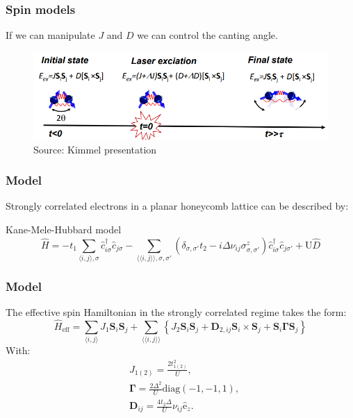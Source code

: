 \documentclass{beamer}
\newcommand{\bs}[1] {\boldsymbol{#1}}
\begin{document}
\begin{frame}
\frametitle{Spin models}
If we can manipulate $J$ and $D$ we can control the canting angle.
\begin{figure}
\includegraphics[width=1\linewidth]{../Figures/canted_afm.png}
\caption{Source: Kimmel presentation}
\end{figure}
\end{frame}




\begin{frame}
\frametitle{Model}
Strongly correlated electrons in a planar honeycomb lattice can be described by:
\begin{block}{Kane-Mele-Hubbard model}
\begin{equation}
\hat{H} = - t_1\sum_{\langle i,j \rangle, \sigma} \hat{c}_{i \sigma}^\dagger \hat{c}_{j \sigma} -
	\sum_{\langle \langle i,j \rangle \rangle, \sigma, \sigma'}(\delta_{\sigma,\sigma'}t_2 - i\Delta\nu_{ij}\sigma^z_{\sigma, \sigma'})\hat{c}_{i \sigma}^\dagger \hat{c}_{j \sigma'} + \text{U}\hat{D}\nonumber
\end{equation}

\end{block}
\end{frame}


\begin{frame}
\frametitle{Model}
The effective spin Hamiltonian in the strongly correlated regime takes the form:
\begin{equation}
\hat{H}_{\text{eff}} = \sum_{\langle i,j \rangle} J_{1}\bs{S}_i\bs{S}_j + \sum_{\langle \langle i,j \rangle \rangle} \left\{ J_{2}\bs{S}_i\bs{S}_j + \bs{D}_{2,ij} \bs{S}_i \times \bs{S}_j + \bs{S}_i \bs{\Gamma} \bs{S}_j \right\} \nonumber
\end{equation}
With:
\begin{align*}
&J_{1(2)} = \frac{2t_{1(2)}^2}{U}, \\
&\bs{\Gamma} =\frac{2\Delta^2}{U} \text{diag}(-1,-1,1),\\
&\bs{D}_{ij} = \frac{4 t_2 \Delta}{U}\nu_{ij}  \hat{\mathrm{e}}_z.
\end{align*}

\end{frame}
\end{document}
